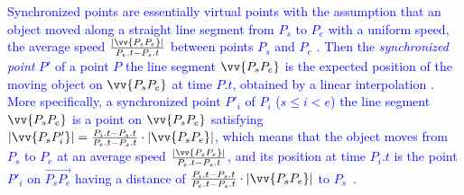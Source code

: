\textcolor{blue}{Synchronized points are essentially virtual points with the assumption that an object moved along a straight line segment from $P_s$ to $P_e$ with a uniform speed, \ie the average speed $\frac{|\vv{P_sP_e}|}{P_e.t-P_s.t}$ between points $P_s$ and $P_e$ \cite{Cao:Spatio,Lin:Cised}. Then the \emph{synchronized point} $P'$ of a point $P$ \wrt the line segment $\vv{P_sP_e}$ is the expected position of the moving object on $\vv{P_sP_e}$ at time $P.t$, obtained by a linear interpolation \cite{Cao:Spatio}. More specifically, a synchronized point $P'_i$ of $P_i$ ($s\le i < e$) \wrt the line segment $\vv{P_sP_e}$ is a point on $\vv{P_sP_{e}}$ satisfying ${|\vv{P_sP'_i}|} = \frac{P_i.t - P_s.t}{P_e.t - P_s.t}\cdot {|\vv{P_sP_e}|}$, which means that the object moves from $P_s$ to $P_e$ at an average speed $\frac{|\vv{P_sP_e}|}{P_e.t-P_s.t}$, and its position at time $P_i.t$ is the point $P'_i$ on $\overrightarrow{P_sP_{e}}$ having a distance of $\frac{P_i.t - P_s.t}{P_e.t - P_s.t}\cdot|\vv{P_sP_e}|$ to $P_s$~\cite{Cao:Spatio, Lin:Cised,Meratnia:Spatiotemporal, Chen:Fast, Zhang:Evaluation}.}


